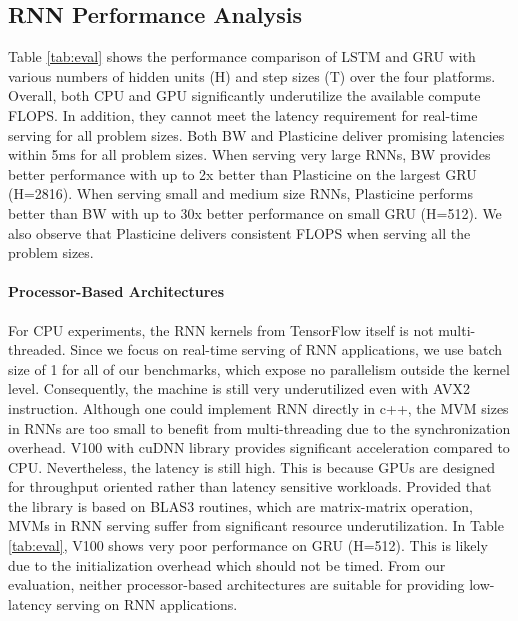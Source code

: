 \subsection{RNN Performance Analysis} \label{sec:results}
Table \ref{tab:eval} shows the performance comparison of LSTM and GRU with various numbers of hidden units (H) and step sizes (T) over
the four platforms. Overall, both CPU and GPU significantly underutilize the available compute FLOPS.
In addition, they cannot meet the latency requirement for real-time serving for all problem sizes.
Both BW and Plasticine deliver promising latencies within 5ms for all problem sizes.
When serving very large RNNs, BW provides better performance
	with up to 2x better than Plasticine on the largest GRU (H=2816).
When serving small and medium size RNNs, Plasticine performs better than BW
	with up to 30x better performance on small GRU (H=512).
We also observe that Plasticine delivers consistent FLOPS when serving all the problem sizes.

\paragraph{Processor-Based Architectures}
For CPU experiments, the RNN kernels from TensorFlow itself is not multi-threaded.
Since we focus on real-time serving of RNN applications, we use batch size of 1 for all of our benchmarks,
	which expose no parallelism outside the kernel level.
Consequently, the machine is still very underutilized even with AVX2 instruction.
Although one could implement RNN directly in c++,
	the MVM sizes in RNNs are too small to benefit from multi-threading due to the synchronization overhead.
V100 with cuDNN library provides significant acceleration compared to CPU.
	Nevertheless, the latency is still high.
This is because GPUs are designed for throughput oriented rather than latency sensitive workloads.
Provided that the library is based on BLAS3 routines, which are matrix-matrix operation, MVMs in 
RNN serving suffer from significant resource underutilization.
In Table \ref{tab:eval}, V100 shows very poor performance on GRU (H=512). This is likely due to
the initialization overhead which should not be timed.
From our evaluation, neither processor-based architectures are suitable for providing low-latency serving on
RNN applications.

